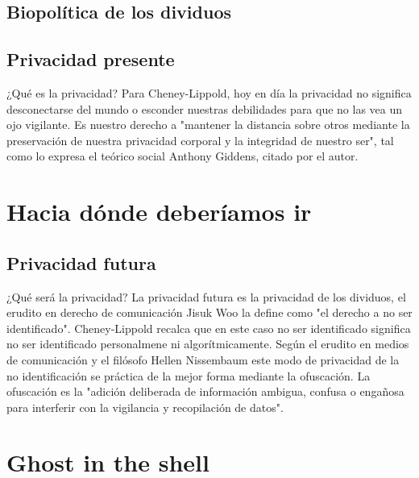 \documentclass[11pt]{article}
\begin{document}
\subsection{Biopolítica de los dividuos}
\subsection{Privacidad presente}
¿Qué es la privacidad? Para Cheney-Lippold, hoy en día la privacidad no significa desconectarse del mundo o esconder nuestras debilidades para que no las vea un ojo vigilante. Es nuestro derecho a "mantener la distancia sobre otros mediante la preservación de nuestra privacidad corporal y la integridad de nuestro ser", tal como lo expresa el teórico social Anthony Giddens, citado por el autor.
\section{Hacia dónde deberíamos ir}
\subsection{Privacidad futura}
¿Qué será la privacidad? La privacidad futura es la privacidad de los dividuos, el erudito en derecho de comunicación Jisuk Woo la define como "el derecho a no ser identificado". Cheney-Lippold recalca que en este caso no ser identificado significa no ser identificado personalmene ni algorítmicamente. Según el erudito en medios de comunicación y el filósofo Hellen Nissembaum este modo de privacidad de la no identificación se práctica de la mejor forma mediante la ofuscación. La ofuscación es la "adición deliberada de información ambigua, confusa o engañosa para interferir con la vigilancia y recopilación de datos".
\section{Ghost in the shell}
\begin{thebibliography}{8}
\end{thebibliography}
\end{document}
